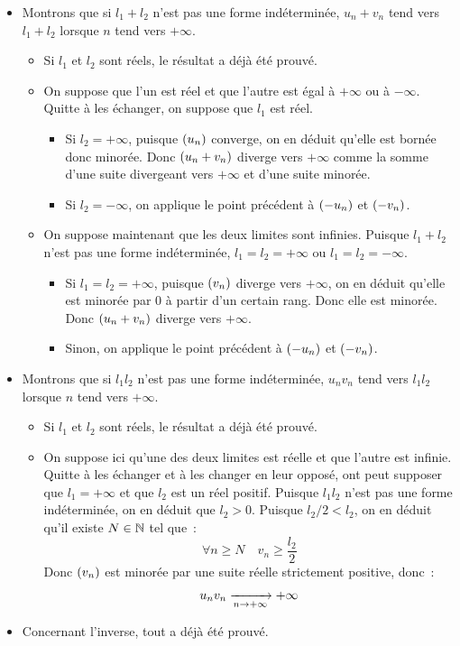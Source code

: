 \documentclass{magnolia}
\begin{document}
\begin{preuve}
\begin{itemize}
\item Montrons que si $l_1+l_2$ n'est pas une forme indéterminée, $u_n+v_n$
  tend vers $l_1+l_2$ lorsque $n$ tend vers $+\infty$.
  \begin{itemize}
  \item Si $l_1$ et $l_2$ sont réels, le résultat a déjà été prouvé.
  \item On suppose que l'un est réel et que l'autre est égal à $+\infty$ ou
    à $-\infty$. Quitte à les échanger, on suppose que $l_1$ est réel.
    \begin{itemize}
    \item Si $l_2=+\infty$, puisque $\left(u_n\right)$ converge, on en déduit qu'elle
      est bornée donc minorée. Donc $\left(u_n+v_n\right)$ diverge vers $+\infty$
      comme la somme d'une suite divergeant vers $+\infty$ et d'une suite
      minorée.
    \item Si $l_2=-\infty$, on applique le point précédent à $\left(-u_n\right)$ et
      $\left(-v_n\right)$.
    \end{itemize}
  \item On suppose maintenant que les deux limites sont infinies. Puisque
    $l_1+l_2$ n'est pas une forme indéterminée, $l_1=l_2=+\infty$ ou
    $l_1=l_2=-\infty$.
    \begin{itemize}
    \item Si $l_1=l_2=+\infty$, puisque $\left(v_n\right)$ diverge vers $+\infty$, on en
      déduit qu'elle est minorée par 0 à partir d'un certain rang. Donc
      elle est minorée. Donc $\left(u_n+v_n\right)$ diverge vers $+\infty$.
    \item Sinon, on applique le point précédent à $\left(-u_n\right)$ et $\left(-v_n\right)$.
    \end{itemize}
  \end{itemize}
\item Montrons que si $l_1 l_2$ n'est pas une forme indéterminée, $u_n v_n$
  tend vers $l_1 l_2$ lorsque $n$ tend vers $+\infty$.
  \begin{itemize}
  \item Si $l_1$ et $l_2$ sont réels, le résultat a déjà été prouvé.
  \item On suppose ici qu'une des deux limites est réelle et que l'autre
    est infinie. Quitte à les échanger et à les changer en leur opposé, ont
    peut supposer que $l_1=+\infty$ et que $l_2$ est un réel positif.
    Puisque $l_1 l_2$ n'est pas une forme indéterminée, on en déduit que
    $l_2>0$. Puisque $l_2/2<l_2$, on en déduit qu'il existe $N\in\mathbb{N}$ tel
    que~:
    \[\forall n\geq N \quad v_n \geq \frac{l_2}{2}\]
    Donc $\left(v_n\right)$ est minorée par une suite réelle strictement positive,
    donc~: \[{u_n v_n \xrightarrow[n\rightarrow +\infty]{} +\infty}\]
  \end{itemize}
\item Concernant l'inverse, tout a déjà été prouvé.
\end{itemize}
\end{preuve}
\end{document}

